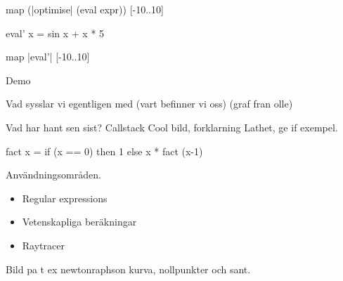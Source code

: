 \documentclass{beamer}
\begin{document}
\begin{frame}[fragile] 
\centering
\begin{codeExDiff}
map (|optimise| (eval expr)) [-10..10]
\end{codeExDiff}

\pause

\begin{codeEx}
eval' x = sin x + x * 5
\end{codeEx}

\pause

\begin{codeExDiff}
map |eval'| [-10..10]
\end{codeExDiff}
\end{frame}

\begin{frame}
\centering
	\Huge{Demo}

\end{frame}




\begin{frame}

	Vad sysslar vi egentligen med (vart befinner vi oss) (graf fran olle)

\end{frame}

\begin{frame}[fragile]
	Vad har hant sen sist?
	\pause
	Callstack
		Cool bild, forklarning
	\pause 
	Lathet, ge if exempel.

\begin{codeEx}
fact x = if (x == 0) 
    then 1
    else x * fact (x-1)
\end{codeEx}

\end{frame}

\begin{frame}
	Användningsområden.
\begin{itemize}
	\item Regular expressions
	\item Vetenskapliga beräkningar %
	\item Raytracer
\end{itemize}

Bild pa t ex newtonraphson kurva, nollpunkter och sant.

\end{frame}
\end{document}
